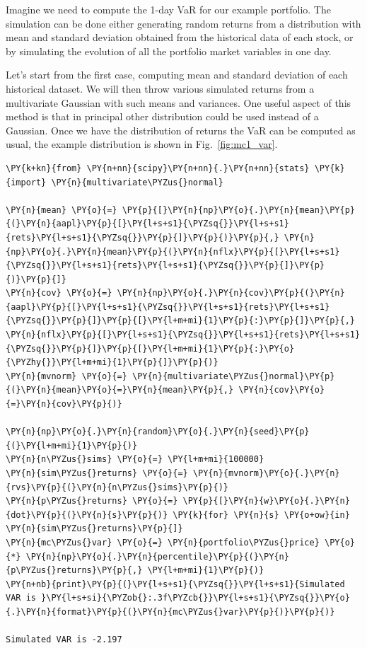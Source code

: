 Imagine we need to compute the 1-day VaR for our example portfolio.
The simulation can be done either generating random returns from a distribution with mean and standard deviation obtained from the historical data of each stock, or by simulating the evolution 
of all the portfolio market variables in one day.

Let's start from the first case, computing mean and standard deviation of each historical dataset. We will then throw various simulated returns from a multivariate Gaussian with such means and variances. 
One useful aspect of this method is that in principal other distribution could be used instead of a Gaussian.
Once we have the distribution of returns the VaR can be computed as usual, the example distribution is shown in Fig.~\ref{fig:mc1_var}.

\begin{tcolorbox}[breakable, size=fbox, boxrule=1pt, pad at break*=1mm,colback=cellbackground, colframe=cellborder]
\begin{Verbatim}[commandchars=\\\{\}]
\PY{k+kn}{from} \PY{n+nn}{scipy}\PY{n+nn}{.}\PY{n+nn}{stats} \PY{k}{import} \PY{n}{multivariate\PYZus{}normal}

\PY{n}{mean} \PY{o}{=} \PY{p}{[}\PY{n}{np}\PY{o}{.}\PY{n}{mean}\PY{p}{(}\PY{n}{aapl}\PY{p}{[}\PY{l+s+s1}{\PYZsq{}}\PY{l+s+s1}{rets}\PY{l+s+s1}{\PYZsq{}}\PY{p}{]}\PY{p}{)}\PY{p}{,} \PY{n}{np}\PY{o}{.}\PY{n}{mean}\PY{p}{(}\PY{n}{nflx}\PY{p}{[}\PY{l+s+s1}{\PYZsq{}}\PY{l+s+s1}{rets}\PY{l+s+s1}{\PYZsq{}}\PY{p}{]}\PY{p}{)}\PY{p}{]}
\PY{n}{cov} \PY{o}{=} \PY{n}{np}\PY{o}{.}\PY{n}{cov}\PY{p}{(}\PY{n}{aapl}\PY{p}{[}\PY{l+s+s1}{\PYZsq{}}\PY{l+s+s1}{rets}\PY{l+s+s1}{\PYZsq{}}\PY{p}{]}\PY{p}{[}\PY{l+m+mi}{1}\PY{p}{:}\PY{p}{]}\PY{p}{,} \PY{n}{nflx}\PY{p}{[}\PY{l+s+s1}{\PYZsq{}}\PY{l+s+s1}{rets}\PY{l+s+s1}{\PYZsq{}}\PY{p}{]}\PY{p}{[}\PY{l+m+mi}{1}\PY{p}{:}\PY{o}{\PYZhy{}}\PY{l+m+mi}{1}\PY{p}{]}\PY{p}{)}		
\PY{n}{mvnorm} \PY{o}{=} \PY{n}{multivariate\PYZus{}normal}\PY{p}{(}\PY{n}{mean}\PY{o}{=}\PY{n}{mean}\PY{p}{,} \PY{n}{cov}\PY{o}{=}\PY{n}{cov}\PY{p}{)}
		
\PY{n}{np}\PY{o}{.}\PY{n}{random}\PY{o}{.}\PY{n}{seed}\PY{p}{(}\PY{l+m+mi}{1}\PY{p}{)}
\PY{n}{n\PYZus{}sims} \PY{o}{=} \PY{l+m+mi}{100000}
\PY{n}{sim\PYZus{}returns} \PY{o}{=} \PY{n}{mvnorm}\PY{o}{.}\PY{n}{rvs}\PY{p}{(}\PY{n}{n\PYZus{}sims}\PY{p}{)}
\PY{n}{p\PYZus{}returns} \PY{o}{=} \PY{p}{[}\PY{n}{w}\PY{o}{.}\PY{n}{dot}\PY{p}{(}\PY{n}{s}\PY{p}{)} \PY{k}{for} \PY{n}{s} \PY{o+ow}{in} \PY{n}{sim\PYZus{}returns}\PY{p}{]}
\PY{n}{mc\PYZus{}var} \PY{o}{=} \PY{n}{portfolio\PYZus{}price} \PY{o}{*} \PY{n}{np}\PY{o}{.}\PY{n}{percentile}\PY{p}{(}\PY{n}{p\PYZus{}returns}\PY{p}{,} \PY{l+m+mi}{1}\PY{p}{)}
\PY{n+nb}{print}\PY{p}{(}\PY{l+s+s1}{\PYZsq{}}\PY{l+s+s1}{Simulated VAR is }\PY{l+s+si}{\PYZob{}:.3f\PYZcb{}}\PY{l+s+s1}{\PYZsq{}}\PY{o}{.}\PY{n}{format}\PY{p}{(}\PY{n}{mc\PYZus{}var}\PY{p}{)}\PY{p}{)}

Simulated VAR is -2.197
\end{Verbatim}
\end{tcolorbox}

